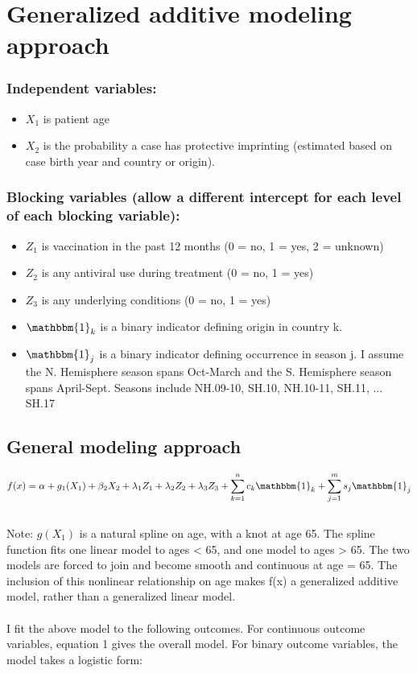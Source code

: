 \documentclass[12pt,twoside]{article}
\begin{document}
\section{Generalized additive modeling approach}

\subsubsection*{Independent variables:}
\begin{itemize}
\item $X_1$ is patient age
\item $X_2$ is the probability a case has protective imprinting (estimated based on case birth year and country or origin).
\end{itemize}


\subsubsection*{Blocking variables (allow a different intercept for each level of each blocking variable):}
\begin{itemize}
\item $Z_1$ is vaccination in the past 12 months (0 = no, 1 = yes, 2 = unknown)
\item $Z_2$ is any antiviral use during treatment (0 = no, 1 = yes)
\item $Z_3$ is any underlying conditions (0 = no, 1 = yes)
\item $\mathbbm{1}_k$ is a binary indicator defining origin in country k.
\item $\mathbbm{1}_j$ is a binary indicator defining occurrence in season j. I assume the N. Hemisphere season spans Oct-March and the S. Hemisphere season spans April-Sept. Seasons include {NH.09-10, SH.10, NH.10-11, SH.11, ... SH.17}
\end{itemize}


\subsection*{General modeling approach}

\begin{equation}
f(x)= \alpha+g_1(X_1)+\beta_2X_2+\lambda_1Z_1+\lambda_2Z_2+\lambda_3Z_3+\sum_{k=1}^{n}c_k \mathbbm{1}_k +\sum_{j=1}^{m}s_j \mathbbm{1}_j
\end{equation}
\\Note: $g(X_1)$ is a natural spline on age, with a knot at age 65. The spline function fits one linear model to ages < 65, and one model to ages > 65. The two models are forced to join and become smooth and continuous at age = 65. The inclusion of this nonlinear relationship on age makes f(x) a generalized additive model, rather than a generalized linear model.\\ \\
I fit the above model to the following outcomes. For continuous outcome variables, equation 1 gives the overall model. For binary outcome variables, the model takes a logistic form:
\end{document}
